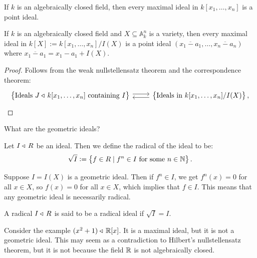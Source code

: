 \documentclass[11pt,a4paper]{article}
\newcommand{\A}{\mathbb A}
\begin{document}
\begin{theorem}
  \label{thm:weak-null}
  If $k$ is an algebraically closed field,
  then every maximal ideal in $k[x_1,\dots,x_n]$ is a point ideal.
\end{theorem}

\begin{corollary}
  If $k$ is an algebraically closed field and $X \subseteq \A_k^n$
  is a variety,
  then every maximal ideal in $k[X] := k[x_1,\dots,x_n] / I(X)$
  is a point ideal $(\overline{x_1 - a_1},\dots,\overline{x_n - a_n})$
  where $\overline{x_1 - a_1} = x_1 - a_1 + I(X)$.
\end{corollary}
\begin{proof}
  Follows from the weak nullstellensatz theorem and the correspondence theorem:
  \[
  \begin{tikzcd}
    \set{\text{Ideals } J \normalin k[x_1,\dots,x_n] \text{ containing } I}
    \arrow[r, shift left,] &
    \set{\text{Ideals in } k[x_1,\dots,x_n] / I(X)}
    \arrow[l, shift left,],
  \end{tikzcd}
  \]
\end{proof}



\begin{question}
  What are the geometric ideals?
\end{question}

\begin{definition}
  Let $I \triangleleft\, R$ be an ideal.
  Then we define the radical of the ideal to be:
  \[
    \sqrt{I} := \left\{f \in R \mid f^n \in I \text{ for some } n \in \mathbb{N}\right\}.
  \]
\end{definition}

\begin{remark}
  \label{rmk:geometric-are-radical}
  Suppose $I = I(X)$ is a geometric ideal.
  Then if $f^n \in I$, we get $f^n(x) = 0$ for all $x \in X$,
  so $f(x) = 0$ for all $x \in X$, which implies that $f \in I$.
  This means that any geometric ideal is necessarily radical.
\end{remark}

\begin{definition}
  A radical $I \triangleleft\, R$ is said to be a radical ideal if $\sqrt I = I$.
\end{definition}

\begin{example}
  Consider the example $(x^2 + 1) \triangleleft\, \mathbb{R}[x]$.
  It is a maximal ideal, but it is not a geometric ideal.
  This may seem as a contradiction to Hilbert's nullstellensatz theorem,
  but it is not because the field $\mathbb{R}$ is not algebraically closed.
\end{example}
\end{document}
